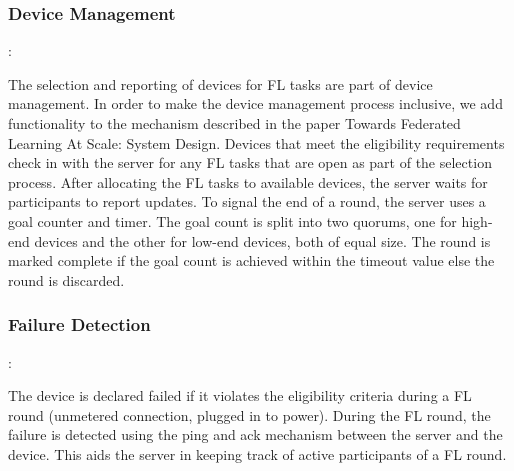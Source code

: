         \subsubsection{Device Management}:
        
            The selection and reporting of devices for FL tasks are part of device management. In order to make the device management process inclusive, we add functionality to the mechanism described in the paper Towards Federated Learning At Scale: System Design. Devices that meet the eligibility requirements check in with the server for any FL tasks that are open as part of the selection process. After allocating the FL tasks to available devices, the server waits for participants to report updates. To signal the end of a round, the server uses a goal counter and timer. The goal count is split into two quorums, one for high-end devices and the other for low-end devices, both of equal size. The round is marked complete if the goal count is achieved within the timeout value else the round is discarded.
        \subsubsection{Failure Detection}:

            The device is declared failed if it violates the eligibility criteria during a FL round (unmetered connection, plugged in to power). During the FL round, the failure is detected using the ping and ack mechanism between the server and the device. This aids the server in keeping track of active participants of a FL round.